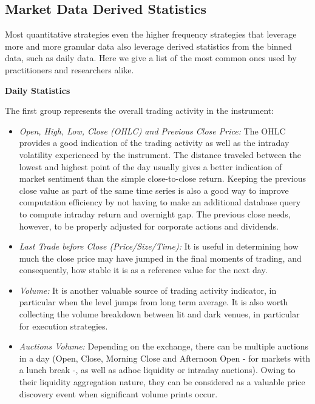 \subsection{Market Data Derived Statistics\label{sec:market_data_derived}}

Most quantitative strategies even the higher frequency strategies that leverage more and more granular data also leverage derived statistics from the binned data, such as daily data. Here we give a list of the most common ones used by practitioners and researchers alike. \twomedskip


\noindent\textbf{Daily Statistics} \twomedskip

The first group represents the overall trading activity in the instrument: 

\begin{itemize}
\item \emph{Open, High, Low, Close (OHLC) and Previous Close Price:} The OHLC provides a good indication of the trading activity as well as the intraday volatility experienced by the instrument. The distance traveled between the lowest and highest point of the day usually gives a better indication of market sentiment than the simple close-to-close return. Keeping the previous close value as part of the same time series is also a good way to improve computation efficiency by not having to make an additional database query to compute intraday return and overnight gap. The previous close needs, however, to be properly adjusted for corporate actions and dividends. 


\item \emph{Last Trade before Close (Price/Size/Time):} It is useful in determining how much the close price may have jumped in the final moments of trading, and consequently, how stable it is as a reference value for the next day.


\item \emph{Volume:} It is another valuable source of trading activity indicator, in particular when the level jumps from long term average. It is also worth collecting the volume breakdown between lit and dark venues, in particular for execution strategies.


\item \emph{Auctions Volume:} Depending on the exchange, there can be multiple auctions in a day (Open, Close, Morning Close and Afternoon Open - for markets with a lunch break -, as well as adhoc liquidity or intraday auctions). Owing to their liquidity aggregation nature, they can be considered as a valuable price discovery event when significant volume prints occur.



\end{itemize}
